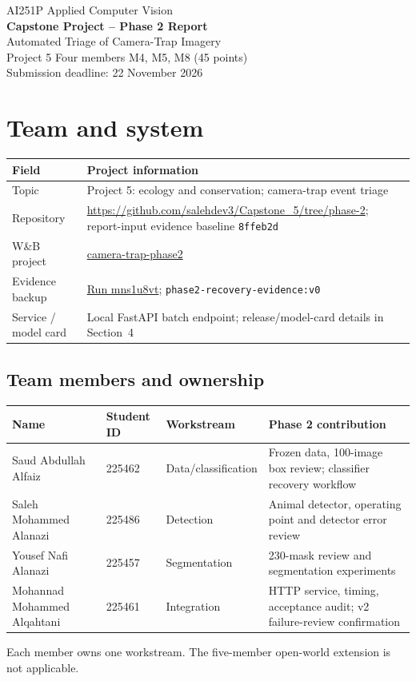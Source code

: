 \documentclass[11pt,a4paper]{article}
\begin{document}
\begin{center}
{\large AI251P Applied Computer Vision}\\[4pt]
{\LARGE\bfseries Capstone Project -- Phase 2 Report}\\[6pt]
{\Large Automated Triage of Camera-Trap Imagery}\\[4pt]
Project 5\;\textperiodcentered\; Four members\;\textperiodcentered\; M4, M5, M8 (45 points)\\[3pt]
Submission deadline: 22 November 2026
\end{center}

\section{Team and system}
\par\noindent\begin{tabularx}{\linewidth}{@{}l Y@{}}\toprule
Field & Project information\\\midrule
Topic & Project 5: ecology and conservation; camera-trap event triage\\
Repository & \url{https://github.com/salehdev3/Capstone_5/tree/phase-2}; report-input evidence baseline \texttt{8ffeb2d}\\
W\&B project & \href{https://wandb.ai/saleh-alanazi-ministry-of-interior/camera-trap-phase2}{camera-trap-phase2}\\
Evidence backup & \href{https://wandb.ai/saleh-alanazi-ministry-of-interior/camera-trap-phase2/runs/mns1u8vt}{Run mns1u8vt}; \texttt{phase2-recovery-evidence:v0}\\
Service / model card & Local FastAPI batch endpoint; release/model-card details in Section~4\\\bottomrule
\end{tabularx}\par
\subsection*{Team members and ownership}
\par\noindent\begin{tabularx}{\linewidth}{@{}l l l Y@{}}\toprule
Name & Student ID & Workstream & Phase 2 contribution\\\midrule
Saud Abdullah Alfaiz & 225462 & Data/classification & Frozen data, 100-image box review; classifier recovery workflow\\
Saleh Mohammed Alanazi & 225486 & Detection & Animal detector, operating point and detector error review\\
Yousef Nafi Alanazi & 225457 & Segmentation & 230-mask review and segmentation experiments\\
Mohannad Mohammed Alqahtani & 225461 & Integration & HTTP service, timing, acceptance audit; v2 failure-review confirmation\\\bottomrule
\end{tabularx}\par
Each member owns one workstream. The five-member open-world extension is not applicable.
\end{document}
